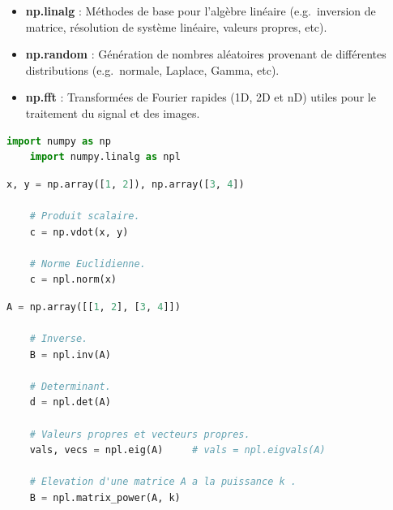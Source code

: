 \documentclass[aspectratio=169]{beamer}
\begin{document}
\begin{frame}[fragile]{}{}
  \vfill
  \begin{itemize}
  \item \textbf{\alert{np.linalg}} : Méthodes de base pour l'algèbre linéaire (e.g.\ inversion de matrice, résolution de système linéaire, valeurs propres, etc).

    \bigskip

  \item \textbf{\alert{np.random}} : Génération de nombres aléatoires provenant de différentes distributions (e.g.\ normale, Laplace, Gamma, etc).

    \bigskip

  \item \textbf{\alert{np.fft}} : Transformées de Fourier rapides (1D, 2D et nD) utiles pour le traitement du signal et des images.
  \end{itemize}
  \vfill
\end{frame}

\begin{frame}[fragile]{}{}
  \vfill
  \begin{lstlisting}[language=Python]
    import numpy as np
    import numpy.linalg as npl
  \end{lstlisting}
  \vfill
\end{frame}

\begin{frame}[fragile]{}{}
  \vfill
  \begin{lstlisting}[language=Python]
    x, y = np.array([1, 2]), np.array([3, 4])

    # Produit scalaire.
    c = np.vdot(x, y)

    # Norme Euclidienne.
    c = npl.norm(x)
  \end{lstlisting}
  \vfill
\end{frame}

\begin{frame}[fragile]{}{}
  \vfill
  \begin{lstlisting}[language=Python]
    A = np.array([[1, 2], [3, 4]])

    # Inverse.
    B = npl.inv(A)

    # Determinant.
    d = npl.det(A)

    # Valeurs propres et vecteurs propres.
    vals, vecs = npl.eig(A)     # vals = npl.eigvals(A)

    # Elevation d'une matrice A a la puissance k .
    B = npl.matrix_power(A, k)
  \end{lstlisting}
  \vfill
\end{frame}
\end{document}
